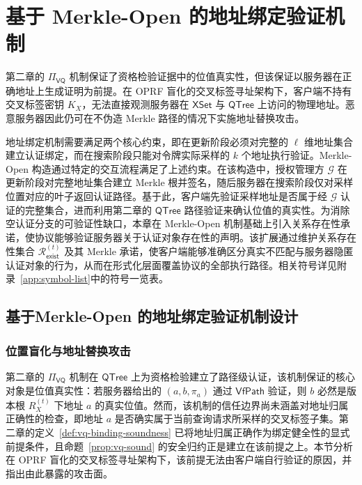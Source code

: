
\chapter{基于 Merkle-Open 的地址绑定验证机制}\label{chap:commitment}

第二章的 $\Pi_{\mathsf{VQ}}$ 机制保证了资格检验证据中的位值真实性，但该保证以服务器在正确地址上生成证明为前提。在 OPRF 盲化的交叉标签寻址架构下，客户端不持有交叉标签密钥 $K_X$，无法直接观测服务器在 $\mathsf{XSet}$ 与 $\mathsf{QTree}$ 上访问的物理地址。恶意服务器因此仍可在不伪造 Merkle 路径的情况下实施地址替换攻击。

地址绑定机制需要满足两个核心约束，即在更新阶段必须对完整的 $\ell$ 维地址集合建立认证绑定，而在搜索阶段只能对令牌实际采样的 $k$ 个地址执行验证。Merkle-Open 构造通过特定的交互流程满足了上述约束。在该构造中，授权管理方 $\mathcal{G}$ 在更新阶段对完整地址集合建立 Merkle 根并签名，随后服务器在搜索阶段仅对采样位置对应的叶子返回认证路径。基于此，客户端先验证采样地址是否属于经 $\mathcal{G}$ 认证的完整集合，进而利用第二章的 $\mathsf{QTree}$ 路径验证来确认位值的真实性。为消除空认证分支的可验证性缺口，本章在 Merkle-Open 机制基础上引入关系存在性承诺，使协议能够验证服务器关于认证对象存在性的声明。该扩展通过维护关系存在性集合 $\mathcal{R}_{\mathsf{exist}}^{(t)}$ 及其 Merkle 承诺，使客户端能够准确区分真实不匹配与服务器隐匿认证对象的行为，从而在形式化层面覆盖协议的全部执行路径。相关符号详见附录~\ref{app:symbol-list}中的符号一览表。
 
\section{基于Merkle-Open 的地址绑定验证机制设计}\label{sec:commit-attack-goal}
\subsection{位置盲化与地址替换攻击}\label{sec:commit-gap}

第二章的 $\Pi_{\mathsf{VQ}}$ 机制在 $\mathsf{QTree}$ 上为资格检验建立了路径级认证，该机制保证的核心对象是位值真实性：若服务器给出的 $(a,b,\pi_a)$ 通过 $\mathsf{VfPath}$ 验证，则 $b$ 必然是版本根 $R_X^{(t)}$ 下地址 $a$ 的真实位值。然而，该机制的信任边界尚未涵盖对地址归属正确性的检查，即地址 $a$ 是否确实属于当前查询请求所采样的交叉标签子集。第二章的定义~\ref{def:vq-binding-soundness} 已将地址归属正确作为绑定健全性的显式前提条件，且命题~\ref{prop:vq-sound} 的安全归约正是建立在该前提之上。本节分析在 OPRF 盲化的交叉标签寻址架构下，该前提无法由客户端自行验证的原因，并指出由此暴露的攻击面。


